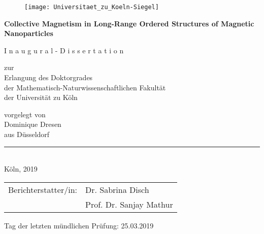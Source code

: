 \begin{titlepage}
  \begin{center}
    \begin{figure}[H]
      \centering
      \texttt{[image: Universitaet\_zu\_Koeln-Siegel]}
    \end{figure}
    \LARGE\textbf{Collective Magnetism in Long-Range Ordered Structures of Magnetic Nanoparticles}

    \vspace{2cm}

    \Large{I n a u g u r a l - D i s s e r t a t i o n } \\

    \vspace{2cm}

    \large{zur}\\
    \large{Erlangung des Doktorgrades}\\
    \large{der Mathematisch-Naturwissenschaftlichen Fakult\"at}\\
    \large der Universit\"at zu K\"oln\\

    \vspace{2cm}

    \large{vorgelegt von}\\
    \large{Dominique Dresen}\\
    \large{aus D\"usseldorf}\\

    \vspace{2cm}

    \noindent\rule{14cm}{0.4pt}\\
    \normalsize{Köln, 2019}\\
  \end{center}
\end{titlepage}

\cleardoublepage


\vspace*{\fill}

\begin{tabular}{@{}ll}
  Berichterstatter/in: & Dr. Sabrina Disch \\
                       & Prof. Dr. Sanjay Mathur
\end{tabular}

\medskip
\vspace{1cm}

Tag der letzten mündlichen Prüfung: 25.03.2019



